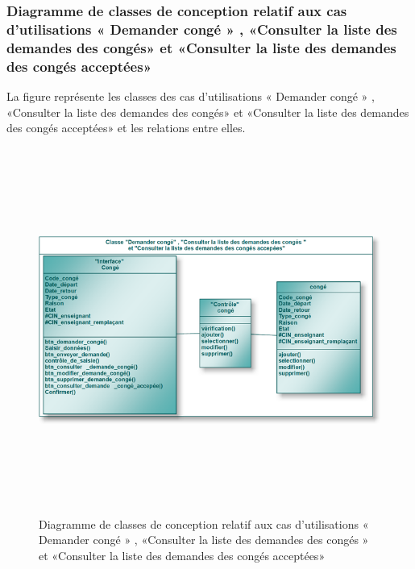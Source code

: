 \documentclass[12 pt ]{report}
\begin{document}
\subsubsection{Diagramme de classes de conception relatif aux cas d'utilisations « Demander congé » , «Consulter la liste des demandes des congés» et «Consulter la liste des demandes des congés acceptées» }
La figure  représente les classes des cas d’utilisations « Demander congé » , «Consulter la liste des demandes des congés» et «Consulter la liste des demandes des congés acceptées» et les relations entre elles.
\begin{figure}[h]
 \begin{center}
\includegraphics[width= 16 cm ,height=  12cm]{cl_dc.PNG}
\caption{Diagramme de classes de conception relatif aux cas d'utilisations « Demander congé » , «Consulter la liste des demandes des congés » et «Consulter la liste des demandes des congés acceptées» }

\end{center}
\end{figure}
\newpage
\end{document}
